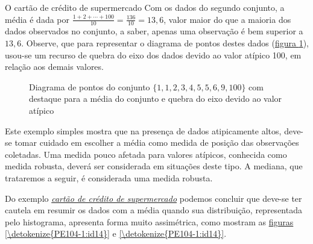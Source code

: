 \begin{example}{O cartão de crédito de supermercado}
Com os dados do segundo conjunto, a média é dada por \(\displaystyle\frac{1+2+\cdots+100}{10}=\frac{136}{10}=13,6\), valor maior do que a maioria dos dados observados no conjunto, a saber, apenas uma observação é bem superior a $13{,}6$. Observe, que para representar o diagrama de pontos destes dados (\hyperref[\detokenize{PE104-1:id13}]{figura \ref{\detokenize{PE104-1:id13}}}), usou-se um recurso de quebra do eixo dos dados devido ao valor atípico 100, em relação aos demais valores.

\begin{figure}[H]
\centering
\capstart

\caption{Diagrama de pontos do conjunto \(\{1, 1, 2, 3, 4, 5, 5, 6, 9, 100\}\) com destaque para a média do conjunto e quebra do eixo devido ao valor atípico}\label{\detokenize{PE104-1:fig-diagramadepontos-media-com-outlier}}\label{\detokenize{PE104-1:id13}}\end{figure}

Este exemplo simples mostra que na presença de dados atipicamente altos, deve-se tomar cuidado em escolher a média como medida de posição das observações coletadas. Uma medida pouco afetada para valores atípicos, conhecida como medida robusta, deverá ser considerada em situações deste tipo. A mediana, que trataremos a seguir, é considerada uma medida robusta.

\end{example}

Do exemplo \hyperref[cartao-credito]{\textit{cartão de crédito de supermercado}} podemos concluir que deve-se ter cautela em resumir os dados com a média quando sua distribuição, representada pelo histograma, apresenta forma muito assimétrica, como mostram as \hyperref[\detokenize{PE104-1:id14}]{figuras} \ref{\detokenize{PE104-1:id14}} e \ref{\detokenize{PE104-1:id14}}.


